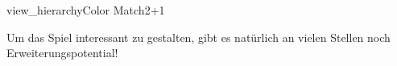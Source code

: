 \documentclass[parskip=half, final]{scrreprt}
\begin{document}
\begin{lecture}
\begin{exc}
\begin{excitem}{view_hierarchy}{Color Match}{2+1}
\begin{description}
	Um das Spiel interessant zu gestalten, gibt es natürlich an vielen Stellen noch Erweiterungspotential!

\end{description}

\end{excitem}

\end{exc}


\end{lecture}



\end{document}
